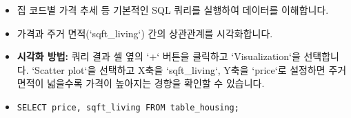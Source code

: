 \documentclass[11pt,a4paper]{article}
\begin{document}
\begin{enumerate}
\begin{itemize}
        \item 집 코드별 가격 추세 등 기본적인 SQL 쿼리를 실행하여 데이터를 이해합니다.
        \item 가격과 주거 면적(`sqft_living`) 간의 상관관계를 시각화합니다.
        \item \textbf{시각화 방법:} 쿼리 결과 셀 옆의 `+` 버튼을 클릭하고 `Visualization`을 선택합니다. `Scatter plot`을 선택하고 X축을 `sqft_living`, Y축을 `price`로 설정하면 주거 면적이 넓을수록 가격이 높아지는 경향을 확인할 수 있습니다.
        \item \lstset{language=SQL}
        \begin{lstlisting}[caption=가격과 주거 면적 상관관계 쿼리]
%sql
SELECT price, sqft_living FROM table_housing;
        \end{lstlisting}
    \end{itemize}
\end{enumerate}
\end{document}
